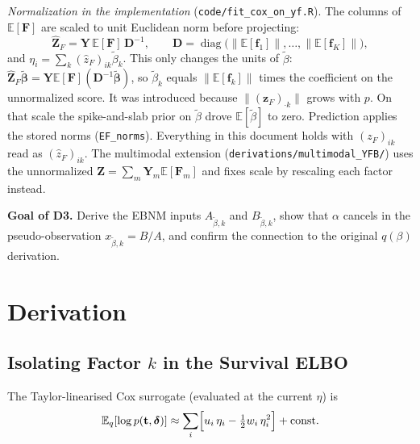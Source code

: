 \documentclass[11pt]{article}
\newcommand{\E}{\mathbb{E}}
\begin{document}
\smallskip
\emph{Normalization in the implementation} (\texttt{code/fit\_cox\_on\_yf.R}). The
columns of $\E[\mathbf{F}]$ are scaled to unit Euclidean norm before projecting:
\[
  \hat{\mathbf{Z}}_F = \mathbf{Y}\,\E[\mathbf{F}]\,\mathbf{D}^{-1},\qquad
  \mathbf{D} = \operatorname{diag}\bigl(\lVert\E[\mathbf{f}_1]\rVert,\dots,\lVert\E[\mathbf{f}_K]\rVert\bigr),
\]
and $\eta_i = \sum_k(\hat z_F)_{ik}\tilde\beta_k$. This only changes the units of
$\tilde\beta$: $\hat{\mathbf{Z}}_F\tilde{\boldsymbol\beta} = \mathbf{Y}\E[\mathbf{F}]
(\mathbf{D}^{-1}\tilde{\boldsymbol\beta})$, so $\tilde\beta_k$ equals
$\lVert\E[\mathbf{f}_k]\rVert$ times the coefficient on the unnormalized score. It was
introduced because $\lVert(\mathbf{z}_F)_{\cdot k}\rVert$ grows with $p$. On that scale
the spike-and-slab prior on $\tilde\beta$ drove $\E[\tilde\beta]$ to zero. Prediction
applies the stored norms (\texttt{EF\_norms}). Everything in this document holds with
$(z_F)_{ik}$ read as $(\hat z_F)_{ik}$. The multimodal extension
(\texttt{derivations/multimodal\_YFB/}) uses the unnormalized
$\mathbf{Z}=\sum_m\mathbf{Y}_m\E[\mathbf{F}_m]$ and fixes scale by rescaling each factor
instead.

\bigskip
\textbf{Goal of D3.} Derive the EBNM inputs $A_{\tilde\beta,k}$ and $B_{\tilde\beta,k}$,
show that $\alpha$ cancels in the pseudo-observation $x_{\tilde\beta,k} = B/A$, and
confirm the connection to the original $q(\beta)$ derivation.

\section{Derivation}

\subsection{Isolating Factor $k$ in the Survival ELBO}

The Taylor-linearised Cox surrogate (evaluated at the current $\eta$) is
\[
  \E_q[\log p(\mathbf{t}, \boldsymbol{\delta})] \approx
  \sum_i \Bigl[ u_i\,\eta_i - \tfrac{1}{2}w_i\,\eta_i^2 \Bigr] + \text{const}.
\]
\end{document}
